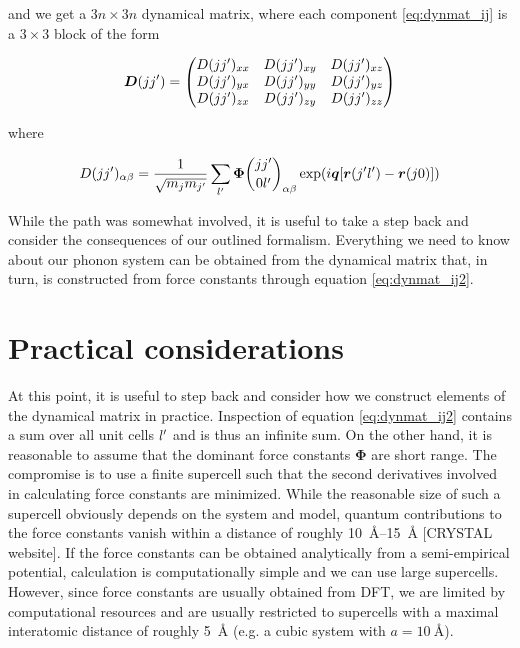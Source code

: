 \noindent and we get a $3n \times 3n$ dynamical matrix, where each component \eqref{eq:dynmat_ij} is a $3 \times 3$ block of the form

\[
\bm{D}(jj^\prime) = \begin{pmatrix}
D(jj^\prime)_{xx} & D(jj^\prime)_{xy} & D(jj^\prime)_{xz} \\
D(jj^\prime)_{yx} & D(jj^\prime)_{yy} & D(jj^\prime)_{yz} \\
D(jj^\prime)_{zx} & D(jj^\prime)_{zy} & D(jj^\prime)_{zz}
\end{pmatrix}
\]

\noindent where

\begin{equation}
D(j\jp)_{\alpha\beta} = \frac{1}{\sqrt{m_j m_{\jp}}} \sum_{\lp} \fczero _{\alpha\beta} \exp (i\bm{q}[\bm{r}(\jp\lp) - \bm{r}(j0)]) \label{eq:dynmat_ij2}
\end{equation}

\noindent While the path was somewhat involved, it is useful to take a step back and consider the consequences of our outlined formalism. Everything we need to know about our phonon system can be obtained from the dynamical matrix that, in turn,  is constructed from force constants through equation \eqref{eq:dynmat_ij2}. 

\section{Practical considerations}
At this point, it is useful to step back and consider how we construct elements of the dynamical matrix in practice. Inspection of equation \eqref{eq:dynmat_ij2} contains a sum over all unit cells $l^\prime$ and is thus an infinite sum. On the other hand, it is reasonable to assume that the dominant force constants $\bm{\Phi}$ are short range. The compromise is to use a finite supercell such that the second derivatives involved in calculating force constants are minimized. While the reasonable size of such a supercell obviously depends on the system and model, quantum contributions to the force constants vanish within a distance of roughly \SIrange{10}{15}{\angstrom} [CRYSTAL website]. If the force constants can be obtained analytically from a semi-empirical potential, calculation is computationally simple and we can use large supercells. However, since force constants are usually obtained from DFT, we are limited by computational resources and are usually restricted to supercells with a maximal interatomic distance of roughly \SI{5}{\angstrom} (e.g. a cubic system with $a=\SI{10}{\angstrom}$).

